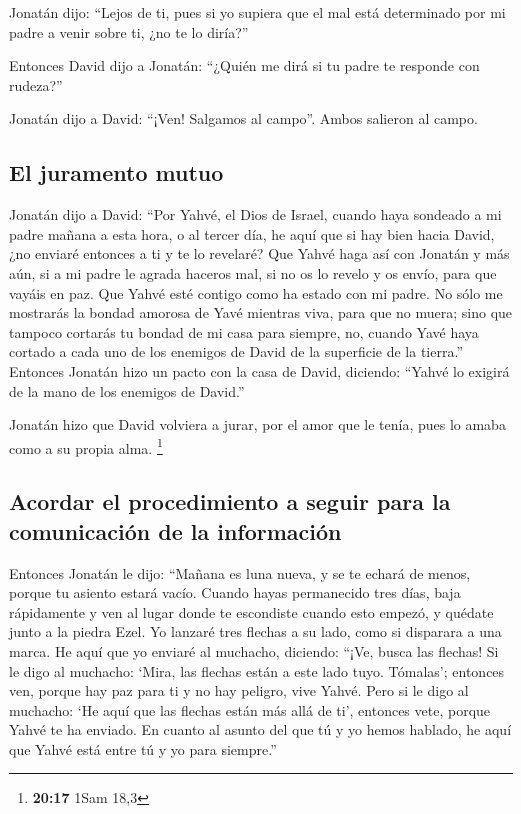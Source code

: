 \begin{paracol}{2}
 Jonatán dijo: ``Lejos de ti, pues si yo supiera que el
mal está determinado por mi padre a venir sobre ti, ¿no te lo diría?''

 Entonces David dijo a Jonatán: ``¿Quién me dirá si tu
padre te responde con rudeza?''

 Jonatán dijo a David: ``¡Ven! Salgamos al campo''. Ambos
salieron al campo.

\hypertarget{el-juramento-mutuo}{%
\subsection{El juramento mutuo}\label{el-juramento-mutuo}}

 Jonatán dijo a David: ``Por Yahvé, el Dios de Israel,
cuando haya sondeado a mi padre mañana a esta hora, o al tercer día, he
aquí que si hay bien hacia David, ¿no enviaré entonces a ti y te lo
revelaré?  Que Yahvé haga así con Jonatán y más aún, si a
mi padre le agrada haceros mal, si no os lo revelo y os envío, para que
vayáis en paz. Que Yahvé esté contigo como ha estado con mi padre.
 No sólo me mostrarás la bondad amorosa de Yavé mientras
viva, para que no muera;  sino que tampoco cortarás tu
bondad de mi casa para siempre, no, cuando Yavé haya cortado a cada uno
de los enemigos de David de la superficie de la tierra.''
 Entonces Jonatán hizo un pacto con la casa de David,
diciendo: ``Yahvé lo exigirá de la mano de los enemigos de David.''

 Jonatán hizo que David volviera a jurar, por el amor que
le tenía, pues lo amaba como a su propia alma. \footnote{\textbf{20:17}
  1Sam 18,3}

\hypertarget{acordar-el-procedimiento-a-seguir-para-la-comunicaciuxf3n-de-la-informaciuxf3n}{%
\subsection{Acordar el procedimiento a seguir para la comunicación de la
información}\label{acordar-el-procedimiento-a-seguir-para-la-comunicaciuxf3n-de-la-informaciuxf3n}}

 Entonces Jonatán le dijo: ``Mañana es luna nueva, y se
te echará de menos, porque tu asiento estará vacío. 
Cuando hayas permanecido tres días, baja rápidamente y ven al lugar
donde te escondiste cuando esto empezó, y quédate junto a la piedra
Ezel.  Yo lanzaré tres flechas a su lado, como si
disparara a una marca.  He aquí que yo enviaré al
muchacho, diciendo: ``¡Ve, busca las flechas! Si le digo al muchacho:
`Mira, las flechas están a este lado tuyo. Tómalas'; entonces ven,
porque hay paz para ti y no hay peligro, vive Yahvé. 
Pero si le digo al muchacho: `He aquí que las flechas están más allá de
ti', entonces vete, porque Yahvé te ha enviado.  En
cuanto al asunto del que tú y yo hemos hablado, he aquí que Yahvé está
entre tú y yo para siempre.''


\end{paracol}
